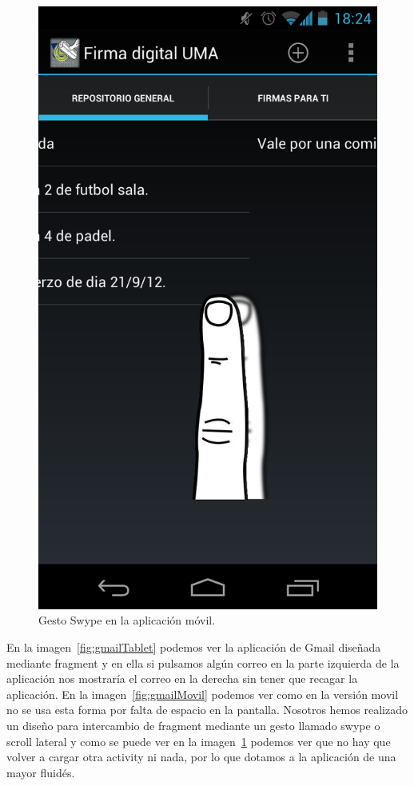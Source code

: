 \begin{itemize}
\begin{figure}[h]
  \centering
    \includegraphics[scale=0.2]{./Android/imagenes/swype.png}
  \caption{Gesto Swype en la aplicación móvil.}
  \label{fig:swype}
\end{figure}

En la imagen~\ref{fig:gmailTablet} podemos ver la aplicación de Gmail diseñada mediante fragment y en ella si pulsamos algún correo en la parte izquierda de la aplicación nos mostraría el correo en la derecha sin tener que recagar la aplicación. En la imagen~\ref{fig:gmailMovil} podemos ver como en la versión movil no se usa esta forma por falta de espacio en la pantalla. Nosotros hemos realizado un diseño para intercambio de fragment mediante un gesto llamado swype o scroll lateral y como se puede ver en la imagen~\ref{fig:swype} podemos ver que no hay que volver a cargar otra activity ni nada, por lo que dotamos a la aplicación de una mayor fluidés.


\end{itemize}
